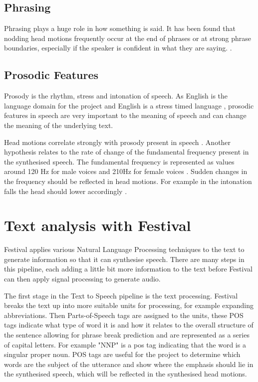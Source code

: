 \documentclass[bsc,frontabs,twoside,singlespacing,parskip,deptreport]{infthesis}
\begin{document}
\subsection{Phrasing}

Phrasing plays a huge role in how something is said. It has been found that nodding head motions frequently occur at the end of phrases or at strong phrase boundaries, especially if the speaker is confident in what they are saying. \cite{ishi2008}. 

\subsection{Prosodic Features}

Prosody is the rhythm, stress and intonation of speech. As English is the language domain for the project and English is a stress timed language \cite{stress_timed}, prosodic features in speech are very important to the meaning of speech and can change the meaning of the underlying text.

Head motions correlate strongly with prosody present in speech \cite{vis_prosody}. Another hypothesis relates to the rate of change of the fundamental frequency present in the synthesised speech. The fundamental frequency is represented as values around 120 Hz for male voices and 210Hz for female voices \cite{f0_values}. Sudden changes in the frequency should be reflected in head motions. For example in the intonation falls the head should lower accordingly \cite{Kendon}.

\section{Text analysis with Festival}

Festival \cite{festival} applies various Natural Language Processing techniques to the text to generate information  so that it can synthesise speech.  There are many steps in this pipeline, each adding a little bit more information to the text before Festival can then apply signal processing to generate audio. 

The first stage in the Text to Speech pipeline is the text processing. Festival breaks the text up into more suitable units for processing, for example expanding abbreviations. Then Parts-of-Speech tags are assigned to the units, these POS tags indicate what type of word it is and how it relates to the overall structure of the sentence allowing for phrase break prediction and are represented as a series of capital letters. For example "NNP" is a pos tag indicating that the word is a singular proper noun. POS tags are useful for the project to determine which words are the subject of the utterance and show where the emphasis should lie in the synthesised speech, which will be reflected in the synthesised head motions.
\end{document}
